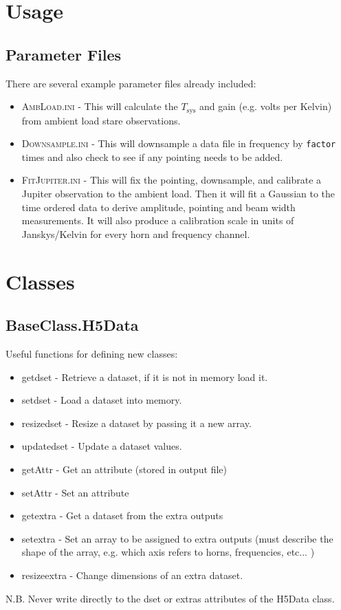 \documentclass[11pt]{article}
\begin{document}
\section{Usage}\label{sec:usage}

\subsection{Parameter Files}

There are several example parameter files already included:
\begin{itemize}
  \item \textsc{AmbLoad.ini}    - This will calculate the $T_\mathrm{sys}$ and gain (e.g. volts per Kelvin) from ambient load stare observations.
  \item \textsc{Downsample.ini} - This will downsample a data file in frequency by \texttt{factor} times and also check to see if any pointing needs to be added.
  \item \textsc{FitJupiter.ini} - This will fix the pointing, downsample, and calibrate a Jupiter observation to the ambient load. Then it will fit a Gaussian to the time ordered data to derive amplitude, pointing and beam width measurements. It will also produce a calibration scale in units of Janskys/Kelvin for every horn and frequency channel.
\end{itemize}


\section{Classes}\label{sec:classes}

\subsection{BaseClass.H5Data}

Useful functions for defining new classes:
\begin{itemize}
  \item getdset - Retrieve a dataset, if it is not in memory load it.
  \item setdset - Load a dataset into memory.
  \item resizedset - Resize a dataset by passing it a new array.
  \item updatedset - Update a dataset values.
  \item getAttr    - Get an attribute (stored in output file)
  \item setAttr    - Set an attribute
  \item getextra - Get a dataset from the extra outputs
  \item setextra - Set an array to be assigned to extra outputs (must describe the shape of the array, e.g. which axis refers to horns, frequencies, etc... )
  \item resizeextra - Change dimensions of an extra dataset.
\end{itemize}
N.B. Never write directly to the dset or extras attributes of the H5Data class.
\end{document}
